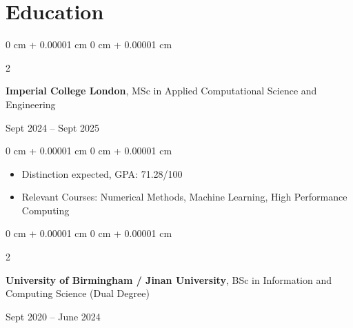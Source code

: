 \documentclass[10pt, letterpaper]{article}
\newenvironment{highlights}{
    \begin{itemize}[
        topsep=0.10 cm,
        parsep=0.10 cm,
        partopsep=0pt,
        itemsep=0pt,
        leftmargin=0 cm + 10pt
    ]
}{
    \end{itemize}
} %
\newenvironment{highlightsforbulletentries}{
    \begin{itemize}[
        topsep=0.10 cm,
        parsep=0.10 cm,
        partopsep=0pt,
        itemsep=0pt,
        leftmargin=10pt
    ]
}{
    \end{itemize}
} %
\newenvironment{onecolentry}{
    \begin{adjustwidth}{
        0 cm + 0.00001 cm
    }{
        0 cm + 0.00001 cm
    }
}{
    \end{adjustwidth}
} %
\newenvironment{twocolentry}[2][]{
    \onecolentry
    \def\secondColumn{#2}
    \setcolumnwidth{\fill, 4.5 cm}
    \begin{paracol}{2}
}{
    \switchcolumn \raggedleft \secondColumn
    \end{paracol}
    \endonecolentry
} %
\begin{document}
    









\section{Education}

    \begin{twocolentry}{
        Sept 2024 -- Sept 2025
    }
        \textbf{Imperial College London}, MSc in Applied Computational Science and Engineering
    \end{twocolentry}

    \vspace{0.10 cm}
    \begin{onecolentry}
        \begin{highlights}
            \item Distinction expected, GPA: 71.28/100
            \item Relevant Courses: Numerical Methods, Machine Learning, High Performance Computing
        \end{highlights}
    \end{onecolentry}

    \begin{twocolentry}{
        Sept 2020 -- June 2024
    }
        \textbf{University of Birmingham / Jinan University}, BSc in Information and Computing Science (Dual Degree)
    \end{twocolentry}
\end{document}
